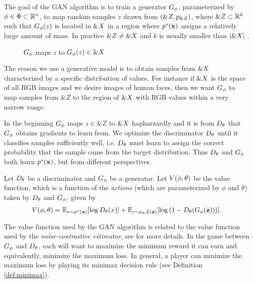 The goal of the GAN algorithm is to train a generator $G_\phi$,
parameterized by $\phi \in \Phi \subset \mathbb{R}^n$, to map random samples
$z$ drawn from $(\&Z, p_{\&Z})$, where $\&Z \subset \mathbb{R}^k$
such that $G_\phi(z)$ is located in $\&X$ in a region where $p^*(\mathbf{x})$
assigns a relatively large amount of mass. In practice
$\&Z \not = \&X$ and $k$ is usually smaller than $|\&X|$
\cite{ref:arjovsky-2017}.

\begin{figure}[H] \centering
  \caption{$G_\phi$ maps $z$ to $G_\phi(z) \in \&X$}
  \label{fig:g-maps}
\end{figure}

The reason we use a generative model is to obtain samples from
$\&X$ characterized by a specific distribution of values. For
instance if $\&X$ is the space of all RGB images and we desire
images of human faces, then we want $G_\phi$ to map samples from $\&Z$ to
the region of $\&X$ with RGB values within a very narrow range.

In the beginning $G_\phi$ maps $z \in \&Z$ to $\&X$ hapharzardly and
it is from $D_\theta$ that $G_\phi$ obtains gradients to learn from. We optimize
the discriminator $D_\theta$ until it classifies samples sufficiently well,
i.e. $D_\theta$ must learn to assign the correct probability that the sample
came from the target distribution. Thus $D_\theta$ and $G_\phi$ both learn
$p^*(\mathbf{x})$, but from different perspectives.

Let $D_\theta$ be a discriminator and $G_\phi$ be a generator. Let $V(\phi, \theta)$ be the
value function, which is a function of the \textit{actions} (which are
parameterized by $\phi$ and $\theta$) taken by $D_\theta$ and $G_\phi$, given by
\begin{align}
  \label{eq:the-original-objective-function}
  V(\phi, \theta) = \mathbb{E}_{x \sim p^*(\mathbf{x})}[{\log D_\theta(x})] +
  \mathbb{E}_{z \sim p_\&Z(\mathbf{z})}[\log{(1 - D_\theta(G_\phi(\mathbf{z})))}].
\end{align}

The value function used by the GAN algorithm is related to the value
function used by the \textit{noise-contrastive estimator}, see
\cite{ref:gutmann-2010} for more details. In the game between $G_\phi$ and
$D_\theta$, each will want to maximize the minimum reward it can earn and
equivalently, minimize the maximum loss. In general, a player can
minimize the maximum loss by playing its minimax decision rule (see
Definition \ref{def:minimax}).

